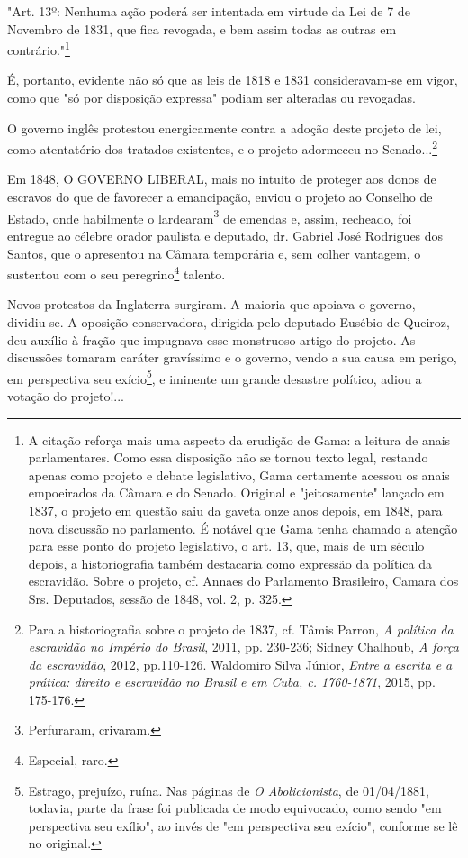"Art. 13º: Nenhuma ação poderá ser intentada em virtude da Lei de 7 de
Novembro de 1831, que fica revogada, e bem assim todas as outras em
contrário."\footnote{A citação reforça mais uma aspecto da erudição de
  Gama: a leitura de anais parlamentares. Como essa disposição não se
  tornou texto legal, restando apenas como projeto e debate legislativo,
  Gama certamente acessou os anais empoeirados da Câmara e do Senado.
  Original e "jeitosamente" lançado em 1837, o projeto em questão saiu
  da gaveta onze anos depois, em 1848, para nova discussão no
  parlamento. É notável que Gama tenha chamado a atenção para esse ponto
  do projeto legislativo, o art. 13, que, mais de um século depois, a
  historiografia também destacaria como expressão da política da
  escravidão. Sobre o projeto, cf. Annaes do Parlamento Brasileiro,
  Camara dos Srs. Deputados, sessão de 1848, vol. 2, p. 325.}

É, portanto, evidente não só que as leis de 1818 e 1831 consideravam-se
em vigor, como que "só por disposição expressa" podiam ser alteradas ou
revogadas.

O governo inglês protestou energicamente contra a adoção deste projeto
de lei, como atentatório dos tratados existentes, e o projeto adormeceu
no Senado...\footnote{Para a historiografia sobre o projeto de 1837,
  cf. Tâmis Parron, \emph{A política da escravidão no Império do
  Brasil}, 2011, pp. 230-236; Sidney Chalhoub, \emph{A força da
  escravidão}, 2012, pp.110-126. Waldomiro Silva Júnior, \emph{Entre a
  escrita e a prática: direito e escravidão no Brasil e em Cuba, c.
  1760-1871}, 2015, pp. 175-176.}

Em 1848, O GOVERNO LIBERAL, mais no intuito de proteger aos donos de
escravos do que de favorecer a emancipação, enviou o projeto ao Conselho
de Estado, onde habilmente o lardearam\footnote{Perfuraram, crivaram.}
de emendas e, assim, recheado, foi entregue ao célebre orador paulista e
deputado, dr. Gabriel José Rodrigues dos Santos, que o apresentou na
Câmara temporária e, sem colher vantagem, o sustentou com o seu
peregrino\footnote{Especial, raro.} talento.

Novos protestos da Inglaterra surgiram. A maioria que apoiava o governo,
dividiu-se. A oposição conservadora, dirigida pelo deputado Eusébio de
Queiroz, deu auxílio à fração que impugnava esse monstruoso artigo do
projeto. As discussões tomaram caráter gravíssimo e o governo, vendo a
sua causa em perigo, em perspectiva seu exício\footnote{Estrago,
  prejuízo, ruína. Nas páginas de \emph{O Abolicionista}, de 01/04/1881,
  todavia, parte da frase foi publicada de modo equivocado, como sendo
  "em perspectiva seu exílio", ao invés de "em perspectiva seu exício",
  conforme se lê no original.}, e iminente um grande desastre político,
adiou a votação do projeto!...

